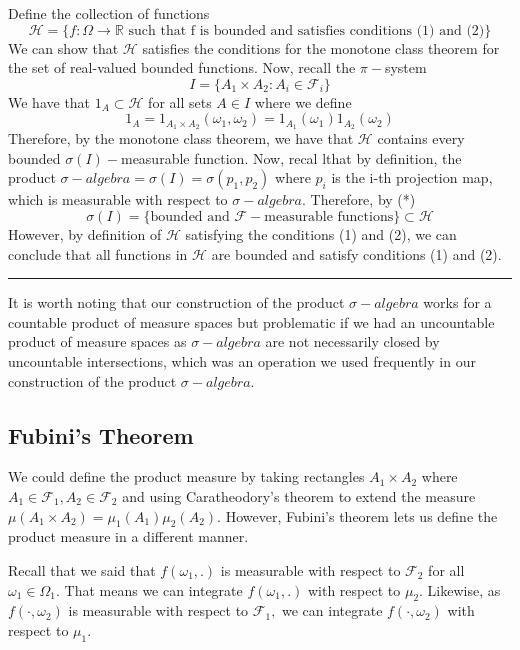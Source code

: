 \documentclass[twoside]{article}
\newenvironment{proof}{{\bf Proof:}}{\hfill\rule{2mm}{2mm}}
\newcommand{\sigmalgebra}{\mathcal{F}}
\newcommand{\sa}{\sigma-algebra}
\begin{document}
\begin{proof} Define the collection of functions 
$$
\mathcal{H} = \{f: \Omega \rightarrow \mathbb{R} \text{ such that f is bounded and satisfies conditions (1) and (2)} \}
$$
We can show that $\mathcal{H}$ satisfies the conditions for the monotone class theorem for the set of real-valued bounded functions. Now, recall the $\pi-$system 
$$
I = \{A_1 \times A_2: A_i \in \sigmalgebra_i\}
$$
We have that $1_A \subset \mathcal{H}$ for all sets $A \in I$ where we define 
$$
1_A = 1_{A_{1} \times A_{2}}(\omega_1, \omega_2) = 1_{A_{1}}(\omega_1)1_{A_{2}}(\omega_2)
$$
Therefore, by the monotone class theorem, we have that $\mathcal{H}$ contains every bounded $\sigma(I)-$measurable function. Now, recal lthat by definition, the product $\sa = \sigma(I) = \sigma(p_1, p_2)$ where $p_i$ is the i-th projection map, which is measurable with respect to $\sa.$ Therefore, by (*)
$$
\sigma(I) = \{\text{bounded and } \sigmalgebra-\text{measurable functions}\} \subset \mathcal{H}
$$
However, by definition of $\mathcal{H}$ satisfying the conditions (1) and (2), we can conclude that all functions in $\mathcal{H}$ are bounded and satisfy conditions (1) and (2).
\end{proof}

It is worth noting that our construction of the product $\sa$ works for a countable product of measure spaces but problematic if we had an uncountable product of measure spaces as $\sa$ are not necessarily closed by uncountable intersections, which was an operation we used frequently in our construction of the product $\sa.$

\subsection{Fubini's Theorem}
We could define the product measure by taking rectangles $A_1 \times A_2$ where $A_1 \in \sigmalgebra_1, A_2 \in \sigmalgebra_2$ and using Caratheodory's theorem to extend the measure $\mu(A_1 \times A_2) = \mu_1(A_1)\mu_2(A_2).$ However, Fubini's theorem lets us define the product measure in a different manner.

Recall that we said that $f(\omega_1,.)$ is measurable with respect to $\sigmalgebra_2$ for all $\omega_1 \in \Omega_1.$ That means we can integrate $f(\omega_1,.)$ with respect to $\mu_2$. Likewise, as $f(\cdot, \omega_2)$ is measurable with respect to $\sigmalgebra_1,$ we can integrate $f(\cdot, \omega_2)$ with respect to $\mu_1.$
\end{document}
